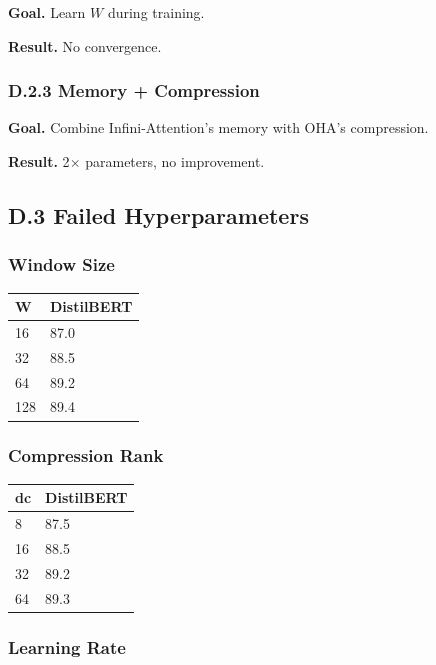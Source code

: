 \textbf{Goal.} Learn $W$ during training.

\textbf{Result.} No convergence.

\subsubsection{D.2.3 Memory + Compression}

\textbf{Goal.} Combine Infini-Attention's memory with OHA's compression.

\textbf{Result.} 2$\times$ parameters, no improvement.

\subsection{D.3 Failed Hyperparameters}

\subsubsection{Window Size}

\begin{table}[H]
\centering
\small
\begin{tabular}{ll}
\toprule
\textbf{W} & \textbf{DistilBERT} \\
\midrule
16 & 87.0 \\
32 & 88.5 \\
64 & 89.2 \\
128 & 89.4 \\
\bottomrule
\end{tabular}
\end{table}

\subsubsection{Compression Rank}

\begin{table}[H]
\centering
\small
\begin{tabular}{ll}
\toprule
\textbf{dc} & \textbf{DistilBERT} \\
\midrule
8 & 87.5 \\
16 & 88.5 \\
32 & 89.2 \\
64 & 89.3 \\
\bottomrule
\end{tabular}
\end{table}

\subsubsection{Learning Rate}

